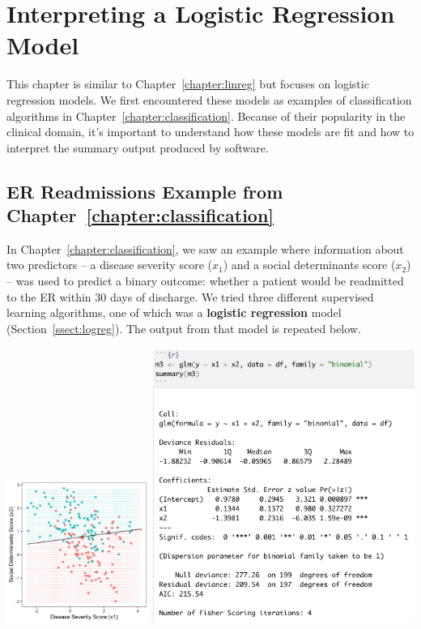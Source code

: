 \chapter{Interpreting a Logistic Regression Model \label{chapter:logreg}}

This chapter is similar to Chapter~\ref{chapter:linreg} but focuses on logistic regression models. We first encountered these models as examples of classification algorithms in Chapter~\ref{chapter:classification}. Because of their popularity in the clinical domain, it's important to understand how these models are fit and how to interpret the summary output produced by software. 


\section{ER Readmissions Example from Chapter~\ref{chapter:classification}}

In Chapter~\ref{chapter:classification}, we saw an example where information about two predictors -- a disease severity score ($x_1$) and a social determinants score ($x_2$) -- was used to predict a binary outcome: whether a patient would be readmitted to the ER within 30 days of discharge. We tried three different supervised learning algorithms, one of which was a \textbf{logistic regression} model (Section~\ref{ssect:logreg}). The output from that model is repeated below.

\begin{center}
\includegraphics[width=0.35\textwidth]{img/esl-logistic.png}
\includegraphics[width=0.64\textwidth]{img/glm-binomial-example.png}
\end{center}


